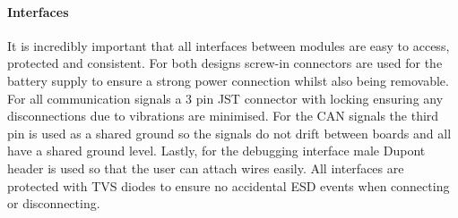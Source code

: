\paragraph{Interfaces}
It is incredibly important that all interfaces between modules are easy to access, protected and consistent. For both designs screw-in connectors are used for the battery supply to ensure a strong power connection whilst also being removable. For all communication signals a 3 pin JST connector with locking ensuring any disconnections due to vibrations are minimised. For the \gls{CAN} signals the third pin is used as a shared ground so the signals do not drift between boards and all have a shared ground level. Lastly, for the debugging interface male Dupont header is used so that the user can attach wires easily. All interfaces are protected with \gls{TVS} diodes to ensure no accidental \gls{ESD} events when connecting or disconnecting. 


\begin{comment}
\subsubsection{Component Placement}\label{sub_sub_section:tgt_component_placement}

\paragraph{Thermal Considerations}
Heat dissipating elements, typically diodes and resistors, can cause damage to electronic component, therefore, heat sinks or controlled airflows are sometimes required. This consideration is why on my devices Buck Converters of above 90\% are used instead of the less efficient \gls{LDO} which would have an efficiency of 66\% when converting from 5V to 3.3V. This, in addition to the low power draws of all other components, means that no explicit thermal management is needed.
\end{comment}
